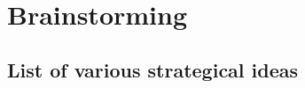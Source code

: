 ~\newpage
\section{Brainstorming}
\label{sec:Section00}

\subsection{List of various strategical ideas}
\label{sec:Section00.a-}